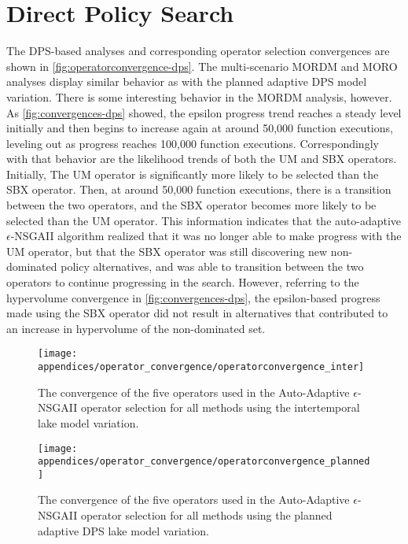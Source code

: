\section{Direct Policy Search}
The DPS-based analyses and corresponding operator selection convergences are shown in \cref{fig:operatorconvergence-dps}. The multi-scenario MORDM and MORO analyses display similar behavior as with the planned adaptive DPS model variation. There is some interesting behavior in the MORDM analysis, however. As \cref{fig:convergences-dps} showed, the epsilon progress trend reaches a steady level initially and then begins to increase again at around 50,000 function executions, leveling out as progress reaches 100,000 function executions. Correspondingly with that behavior are the likelihood trends of both the UM and SBX operators. Initially, The UM operator is significantly more likely to be selected than the SBX operator. Then, at around 50,000 function executions, there is a transition between the two operators, and the SBX operator becomes more likely to be selected than the UM operator. This information indicates that the auto-adaptive $\epsilon$-NSGAII algorithm realized that it was no longer able to make progress with the UM operator, but that the SBX operator was still discovering new non-dominated policy alternatives, and was able to transition between the two operators to continue progressing in the search. However, referring to the hypervolume convergence in \cref{fig:convergences-dps}, the epsilon-based progress made using the SBX operator did not result in alternatives that contributed to an increase in hypervolume of the non-dominated set. 

\begin{figure}[ht]
    \centering
    \captionsetup{width=0.85\textwidth}
    
    \texttt{[image: appendices/operator\_convergence/operatorconvergence\_inter]}
    \caption[Operator convergence for the intertemporal model variation]{The convergence of the five operators used in the Auto-Adaptive $\epsilon$-NSGAII operator selection for all methods using the intertemporal lake model variation.}
    \label{fig:operatorconvergence-inter}
\end{figure}

\begin{figure}[ht]
    \centering
    \captionsetup{width=0.85\textwidth}
    
    \texttt{[image: appendices/operator\_convergence/operatorconvergence\_planned]}
    \caption[Operator convergence for the planned adaptive DPS model variation]{The convergence of the five operators used in the Auto-Adaptive $\epsilon$-NSGAII operator selection for all methods using the planned adaptive DPS lake model variation.}
    \label{fig:operatorconvergence-planned}
\end{figure}

